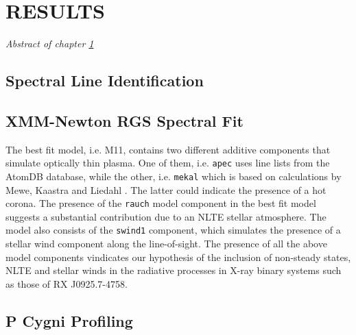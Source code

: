 \def\baselinestretch{1}
\chapter{RESULTS} \label{chap:results}
    \minitoc
    \emph{Abstract of chapter \ref{chap:results}}
    
    \section{Spectral Line Identification}
    
    \section{XMM-Newton RGS Spectral Fit}
    The best fit model, i.e. M11, contains two different additive components that simulate optically thin plasma. One of them, i.e. \texttt{apec} uses line lists from the AtomDB database, while the other, i.e. \texttt{mekal} which is based on calculations by Mewe, Kaastra and Liedahl \cite{meka,liedahl}. The latter could indicate the presence of a hot corona. The presence of the \texttt{rauch} model component in the best fit model suggests a substantial contribution due to an NLTE stellar atmosphere. The model also consists of the \texttt{swind1} component, which simulates the presence of a stellar wind component along the line-of-sight. The presence of all the above model components vindicates our hypothesis of the inclusion of non-steady states, NLTE and stellar winds in the radiative processes in X-ray binary systems such as those of RX J0925.7-4758.
    
    \section{P Cygni Profiling}